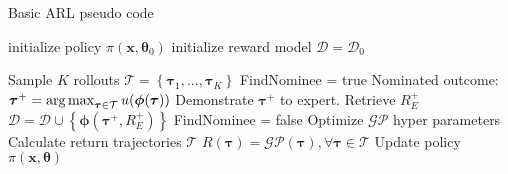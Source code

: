 \documentclass[mscThesis.tex]{subfiles}
\begin{document}
\begin{algorithm}
\caption{Basic ARL pseudo code}
\label{alg:ARL}
\begin{algorithmic}
\State initialize policy $\pi(\bm{x}, \bm{\theta}_0)$
\State initialize reward model $\mathcal{D} = \mathcal{D}_0$

\State


\State Sample $K$ rollouts
\State $\mathcal{T} = \left\{\bm{\tau}_1, ..., \bm{\tau}_K \right\}$
\State
\State FindNominee = true
\State Nominated outcome:
\State $\bm{\tau}^+ = \operatorname*{arg\,max}_{\bm{\tau} \in \mathcal{T}} u(\bm{\phi}(\bm{\tau}))$
\State
{}
\State Demonstrate $\bm{\tau}^+$ to expert. Retrieve $R_E^+$
\State $\mathcal{D} = \mathcal{D} \cup \left\{ \bm{\phi}(\bm{\tau}^+, R^+_E)\right\}$
\Else
\State FindNominee = false
\EndIf 
\EndWhile
\State Optimize $\mathcal{GP}$ hyper parameters
\State
\State Calculate return trajectories $\mathcal{T}$
\State $R(\bm{\tau}) = \mathcal{GP} (\bm{\tau}), \forall \bm{\tau} \in \mathcal{T}$
\State Update policy $\pi (\bm{x}, \bm{\theta})$
\EndWhile
\end{algorithmic}
\end{algorithm}

%
%
\end{document}
